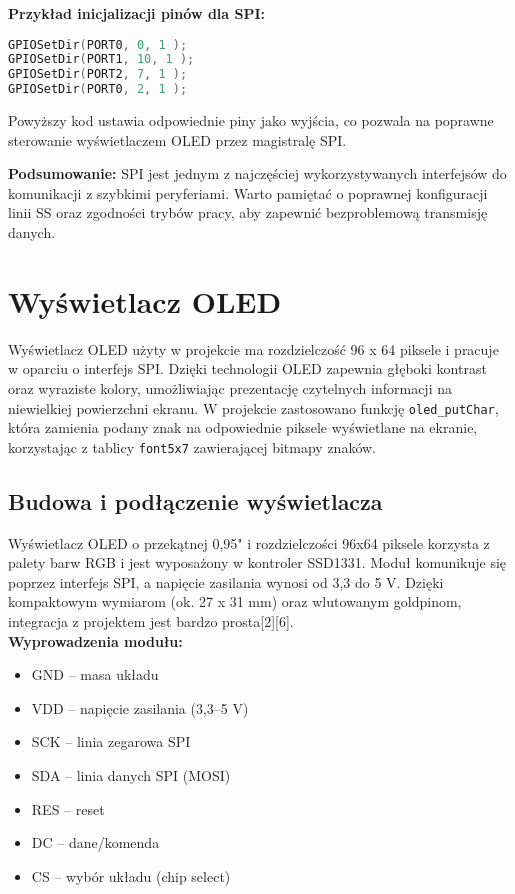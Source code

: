 \documentclass[a4paper,12pt]{report}
\begin{document}
\textbf{Przykład inicjalizacji pinów dla SPI:}
\begin{lstlisting}[language=C]
GPIOSetDir(PORT0, 0, 1 );
GPIOSetDir(PORT1, 10, 1 );
GPIOSetDir(PORT2, 7, 1 );
GPIOSetDir(PORT0, 2, 1 );
\end{lstlisting}
Powyższy kod ustawia odpowiednie piny jako wyjścia, co pozwala na poprawne sterowanie wyświetlaczem OLED przez magistralę SPI.

\textbf{Podsumowanie:}  
SPI jest jednym z najczęściej wykorzystywanych interfejsów do komunikacji z szybkimi peryferiami. Warto pamiętać o poprawnej konfiguracji linii SS oraz zgodności trybów pracy, aby zapewnić bezproblemową transmisję danych.

\section{Wyświetlacz OLED}

Wyświetlacz OLED użyty w projekcie ma rozdzielczość 96 x 64 piksele i pracuje w oparciu o interfejs SPI. Dzięki technologii OLED zapewnia głęboki kontrast oraz wyraziste kolory, umożliwiając prezentację czytelnych informacji na niewielkiej powierzchni ekranu. W projekcie zastosowano funkcję \texttt{oled\_putChar}, która zamienia podany znak na odpowiednie piksele wyświetlane na ekranie, korzystając z tablicy \texttt{font5x7} zawierającej bitmapy znaków.

\subsection*{Budowa i podłączenie wyświetlacza}

Wyświetlacz OLED o przekątnej 0,95" i rozdzielczości 96x64 piksele korzysta z palety barw RGB i jest wyposażony w kontroler SSD1331. Moduł komunikuje się poprzez interfejs SPI, a napięcie zasilania wynosi od 3,3 do 5 V. Dzięki kompaktowym wymiarom (ok. 27 x 31 mm) oraz wlutowanym goldpinom, integracja z projektem jest bardzo prosta[2][6].\\

\textbf{Wyprowadzenia modułu:}
\begin{itemize}
    \item GND – masa układu
    \item VDD – napięcie zasilania (3,3–5 V)
    \item SCK – linia zegarowa SPI
    \item SDA – linia danych SPI (MOSI)
    \item RES – reset
    \item DC – dane/komenda
    \item CS – wybór układu (chip select)
\end{itemize}
\end{document}
